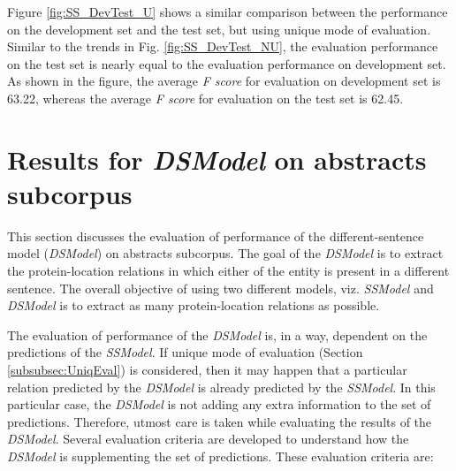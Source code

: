 Figure \ref{fig:SS_DevTest_U} shows a similar comparison between the performance on the development set and the test set, but using unique mode of evaluation. Similar to the trends in Fig. \ref{fig:SS_DevTest_NU}, the evaluation performance on the test set is nearly equal to the evaluation performance on development set. As shown in the figure, the average \textit{F score} for evaluation on development set is 63.22, whereas the average \textit{F score} for evaluation on the test set is 62.45.

\section{Results for \textit{DSModel} on abstracts subcorpus}

This section discusses the evaluation of performance of the different-sentence model (\textit{DSModel}) on abstracts subcorpus. The goal of the \textit{DSModel} is to extract the protein-location relations in which either of the entity is present in a different sentence. The overall objective of using two different models, viz. \textit{SSModel} and \textit{DSModel} is to extract as many protein-location relations as possible.

The evaluation of performance of the \textit{DSModel} is, in a way, dependent on the predictions of the \textit{SSModel}. If unique mode of evaluation (Section \ref{subsubsec:UniqEval}) is considered, then it may happen that a particular relation predicted by the \textit{DSModel} is already predicted by the \textit{SSModel}. In this particular case, the \textit{DSModel} is not adding any extra information to the set of predictions. Therefore, utmost care is taken while evaluating the results of the \textit{DSModel}. Several evaluation criteria are developed to understand how the \textit{DSModel} is supplementing the set of predictions. These evaluation criteria are:

